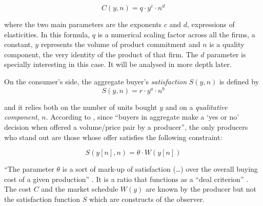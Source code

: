 \documentclass[a4paper, 12pt, openright, oneside, german, french, brazil, english, article]{abntex2}
\begin{document}
	\begin{equation}
	\label{cost}
		C(y, n) = q \cdot y^c \cdot n^d
	\end{equation}
	
	where the two main parameters are the exponents $c$ and $d$, expressions of elasticities. In this formula, $q$ is a numerical scaling factor across all the firms, a constant, $y$ represents the volume of product commitment and $n$ is a quality component, the very identity of the product of that firm. The $d$ parameter is specially interesting in this case. It will be analysed in more depth later.
	
	On the consumer's side, the aggregate buyer's \textit{satisfaction} $ S(y, n) $ is defined by 
	\begin{equation}
	\label{satisfaction}
		S(y, n) = r \cdot y^a \cdot n^b 	
	\end{equation}
		
	and it relies both on the number of units bought $y$ and on a \textit{qualitative component}, $n$. According to , since ``buyers in aggregate make a `yes or no' decision when offered a volume/price pair by a producer'', the only producers who stand out are those whose offer satisfies the following constraint:
	
	\begin{equation}
	\label{S-theta}
		S(y[n], n) = \theta \cdot W(y[n])	
	\end{equation}

	
	``The parameter $\theta$ is a sort of mark-up of satisfaction (\dots) over the overall buying cost of a given production'' \cite[p. 217]{favereau2002markets}. It is a ratio that functions as a ``deal criterion'' \cite[p. 39]{white2002markets}. The cost $C$ and the market schedule $W(y)$ are known by the producer but not the satisfaction function $S$ which are constructs of the observer.
	
	
\end{document}
